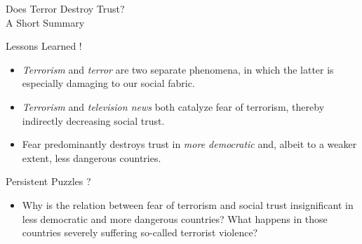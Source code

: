 
\vspace*{1mm}
\begin{flushright}
\Large{Does Terror Destroy Trust? \\
A Short Summary}
\end{flushright} 

\vspace{1cm}
\normalsize

\begin{Box1}{Lessons Learned !}
\begin{itemize}[noitemsep]
\item  \textit{Terrorism} and \textit{terror} are two separate phenomena, in which the latter is especially damaging to our social fabric.
\item \textit{Terrorism} and \textit{television news} both catalyze fear of terrorism, thereby indirectly decreasing social trust.
\item Fear predominantly destroys trust in \textit{more democratic} and, albeit to a weaker extent, less dangerous countries.
\end{itemize}
\end{Box1}

\vspace{1cm}

\begin{Box1}{Persistent Puzzles ?}
\begin{itemize}[noitemsep]
\item  Why is the relation between fear of terrorism and social trust insignificant in less democratic and more dangerous countries? What happens in those countries severely suffering so-called terrorist violence?
\end{itemize}
\end{Box1}
